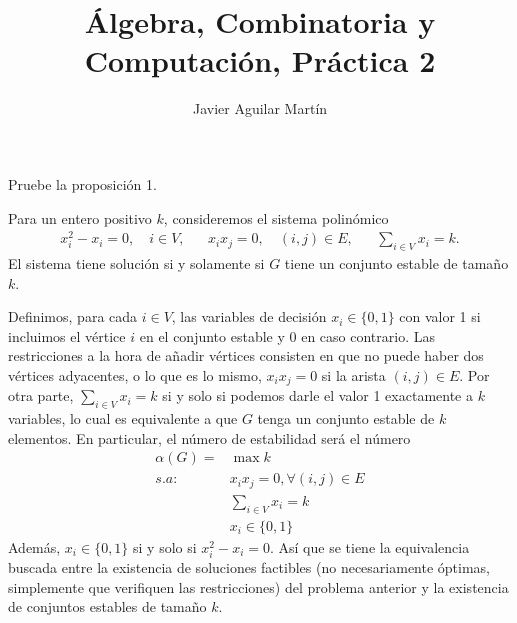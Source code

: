\documentclass[twoside]{article}
\begin{document}
\title{Álgebra, Combinatoria y Computación, Práctica 2}
\author{Javier Aguilar Martín}
\maketitle

\begin{ejercicio}{4}
Pruebe la proposición 1.
\end{ejercicio}
\begin{prop}
Para un entero positivo $k$, consideremos el sistema polinómico
\begin{align*}
x_i^2-x_i=0,\quad i\in V,& & x_ix_j=0,\quad (i,j)\in E,& &\sum_{i\in V}x_i=k.
\end{align*}
El sistema tiene solución si y solamente si $G$ tiene un conjunto estable de tamaño $k$. 
\end{prop}
\begin{solucion}
Definimos, para cada $i\in V$, las variables de decisión $x_i\in\{0,1\}$ con valor 1 si incluimos el vértice $i$ en el conjunto estable y 0 en caso contrario. Las restricciones a la hora de añadir vértices consisten en que no puede haber dos vértices adyacentes, o lo que es lo mismo, $x_ix_j=0$ si la arista $(i,j)\in E$. Por otra parte, $\sum_{i\in V}x_i=k$ si y solo si podemos darle el valor 1 exactamente a $k$ variables, lo cual es equivalente a que $G$ tenga un conjunto estable de $k$ elementos. En particular, el número de estabilidad será el número 
\begin{align*}
\alpha(G)=&\max k\\
s.a:\ &x_ix_j=0, \forall (i,j)\in E\\
&\sum_{i\in V}x_i=k\\
&x_i\in \{0,1\}
\end{align*} 
Además, $x_i\in\{0,1\}$ si y solo si $x_i^2-x_i=0$. Así que se tiene la equivalencia buscada entre la existencia de soluciones factibles (no necesariamente óptimas, simplemente que verifiquen las restricciones) del problema anterior y la existencia de conjuntos estables de tamaño $k$.


\end{solucion}
\end{document}
